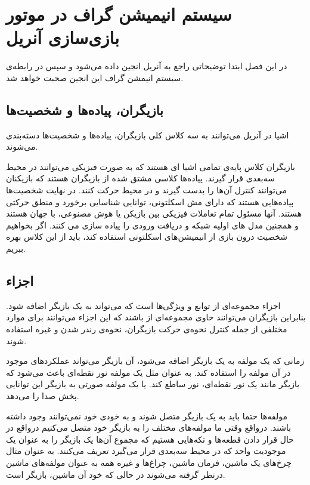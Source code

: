 \chapter {سیستم انیمیشن گراف در موتور بازی‌سازی آنریل}

در این فصل ابتدا توضیحاتی راجع به آنریل انجین داده می‌شود و سپس در رابطه‌ی سیستم انیمشن گراف این انجین صحبت خواهد شد.

\section{بازیگران، پیاده‌ها و شخصیت‌‌ها}

اشیا در آنریل می‌توانند به سه کلاس کلی بازیگران، پیاده‌ها و شخصیت‌ها دسته‌بندی می‌شوند.

بازیگران کلاس پایه‌ی تمامی اشیا ای هستند که به صورت فیزیکی می‌توانند در محیط سه‌بعدی قرار گیرند.
پیاده‌ها کلاسی مشتق شده از بازیگران هستند که بازیکنان می‌توانند کنترل آن‌ها را بدست گیرند و 
در محیط حرکت کنند.
 در نهایت شخصیت‌ها پیاده‌هایی هستند که دارای مش اسکلتونی، توانایی شناسایی برخورد و منطق حرکتی هستند.
 آنها مسئول تمام تعاملات فیزیکی بین بازیکن یا هوش مصنوعی، با جهان هستند و همچنین مدل های اولیه شبکه و دریافت ورودی را پیاده سازی می کنند. 
اگر بخواهیم شخصیت درون بازی از انیمیشن‌های اسکلتونی استفاده کند، باید از این کلاس بهره ببریم.

\section{اجزاء}

اجزاء
مجموعه‌ای از توابع و ویژگی‌ها است که می‌تواند به یک بازیگر اضافه شود.
بنابراین بازیگران می‌توانند حاوی مجموعه‌ای از
باشند که این اجزاء می‌توانند برای موارد مختلفی از جمله
کنترل نحوه‌ی حرکت بازیگران، 
نحوه‌ی رندر شدن و غیره استفاده شوند.

زمانی که یک مولفه به یک بازیگر اضافه می‌شود، آن بازیگر می‌تواند عملکرد‌های موجود در آن مولفه را استفاده کند.
به عنوان مثل یک مولفه نور نقطه‌ای باعث می‌شود که بازیگر مانند یک نور نقطه‌ای، نور ساطع کند.
یا یک مولفه صورتی به بازیگر این توانایی پخش صدا را می‌دهد.

مولفه‌ها حتما باید به یک بازیگر متصل شوند و به خودی خود نمی‌توانند وجود داشته باشند.
درواقع وقتی ما مولفه‌های مختلف را به بازیگر خود متصل می‌کنیم درواقع در حال قرار دادن قطعه‌ها و تکه‌هایی هستیم
 که مجموع آن‌ها یک بازیگر را به عنوان یک موجودیت واحد که در محیط سه‌بعدی قرار می‌گیرد تعریف می‌کنند.
 به عنوان مثال چرخ‌های یک ماشین، فرمان ماشین، چراغ‌ها و غیره همه به عنوان
 مولفه‌های ماشین درنظر گرفته می‌شوند در حالی که خود آن ماشین، بازیگر است.

